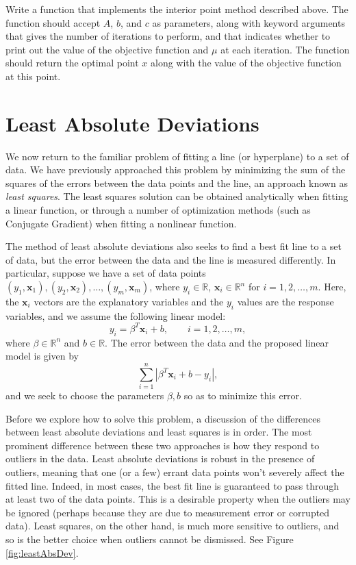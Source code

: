 \begin{problem} %
Write a function  that implements the interior point method described above.
The function should accept $A$, $b$, and $c$ as parameters, along with keyword arguments
 that gives the number of iterations to perform, and  that indicates
whether to print out the value of the objective function and $\mu$ at each iteration.
The function should return the optimal point $x$ along with the value of the objective function at this
point.
\end{problem}

\section*{Least Absolute Deviations}
We now return to the familiar problem of fitting a line (or hyperplane) to a set of data.
We have previously approached this problem by minimizing the sum of the squares of the errors between the data points and the line, an approach known as \emph{least squares}.
The least squares solution can be obtained analytically when fitting a linear function, or through a number of optimization methods (such as Conjugate Gradient) when fitting a nonlinear function.

The method of least absolute deviations also seeks to find a best fit line to a set of data, but the error between the data and the line is measured differently.
In particular, suppose we have a set of data points $(y_1, \mathbf{x}_1), (y_2, \mathbf{x}_2), \ldots, (y_m, \mathbf{x}_m)$, where $y_i \in \mathbb{R}$, $\mathbf{x}_i \in \mathbb{R}^n$ for $i = 1, 2, \ldots, m$.
Here, the $\mathbf{x}_i$ vectors are the explanatory variables and the $y_i$ values are the response variables, and we assume the following linear model:
\[
y_i = \beta^T\mathbf{x}_i + b, \qquad i = 1, 2, \ldots, m,
\]
where $\beta\in\mathbb{R}^n$ and $b \in \mathbb{R}$.
The error between the data and the proposed linear model is given by
\[
\sum_{i=1}^n |\beta^T\mathbf{x}_i + b - y_i|,
\]
and we seek to choose the parameters $\beta, b$ so as to minimize this error.

Before we explore how to solve this problem, a discussion of the differences between least absolute deviations and least squares is in order.
The most prominent difference between these two approaches is how they respond to outliers in the data.
Least absolute deviations is robust in the presence of outliers, meaning that one (or a few) errant data points won't severely affect the fitted line.
Indeed, in most cases, the best fit line is guaranteed to pass through at least two of the data points.
This is a desirable property when the outliers may be ignored (perhaps because they are due to measurement error or corrupted data).
Least squares, on the other hand, is much more sensitive to outliers, and so is the better choice when outliers cannot be dismissed.
See Figure \ref{fig:leastAbsDev}.

